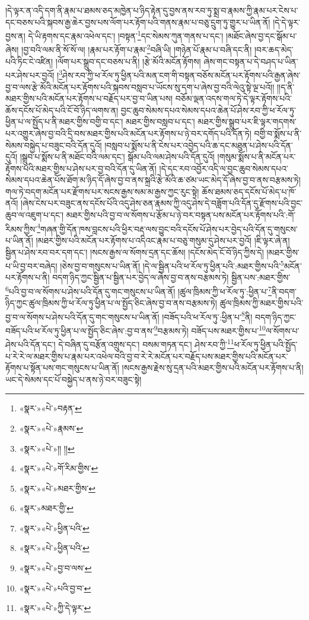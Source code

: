 །དེ་ལྟར་ན་འདི་དག་ནི་རྣམ་པ་ཐམས་ཅད་མཁྱེན་པ་ཉིད་རྟེན་དུ་བྱས་ནས་རབ་ཏུ་སྨྲ་བ་རྣམས་ཀྱི་རྣམ་པར་ངེས་པ་དང་བཅས་པའི་སྐབས་རྒྱ་ཆེར་བྱས་པས་ལོག་པར་རྟོག་པའི་གནས་རྣམ་པ་བཅུ་དྲུག་ཏུ་གྱུར་པ་ཡིན་ནོ། །དེ་དེ་ལྟར་བྱས་ན། དེ་ཡི་རྟགས་དང་རྣམ་འཕེལ་དང་། །བསྟན་\footnote{«སྣར་»«པེ་»བརྟན་}དང་སེམས་ཀུན་གནས་པ་དང་། །མཐོང་ཞེས་བྱ་དང་སྒོམ་པ་ཞེས། །བྱ་བའི་ལམ་ནི་སོ་སོ་ལ། །རྣམ་པར་རྟོག་པ་རྣམ་\footnote{«སྣར་»«པེ་»རྣམས་}བཞི་ཡི། །གཉེན་པོ་རྣམ་པ་བཞི་དང་ནི། །བར་ཆད་མེད་པའི་ཏིང་ངེ་འཛིན། །ལོག་པར་སྒྲུབ་དང་བཅས་པ་ནི། །རྩེ་མོའི་མངོན་རྟོགས། ཞེས་གང་བསྟན་པ་དེ་བཤད་པ་ཡིན་པར་ཤེས་པར་བྱའོ། །\footnote{«སྣར་»«པེ་»།། །།}ཤེས་རབ་ཀྱི་ཕ་རོལ་ཏུ་ཕྱིན་པའི་མན་ངག་གི་བསྟན་བཅོས་མངོན་པར་རྟོགས་པའི་རྒྱན་ཞེས་བྱ་བ་ལས་རྩེ་མོའི་མངོན་པར་རྟོགས་པའི་སྐབས་བསླབ་པ་ཡོངས་སུ་དག་པ་ཞེས་བྱ་བའི་ལེའུ་སྟེ་ལྔ་པའོ།། །།ད་ནི་མཐར་གྱིས་པའི་མངོན་པར་རྟོགས་པ་བརྗོད་པར་བྱ་བ་ཡིན་པས། བཅོམ་ལྡན་འདས་གལ་ཏེ་དེ་ལྟར་རྟོགས་པའི་ཆོས་དངོས་པོ་མེད་པའི་ངོ་བོ་ཉིད་ལགས་ན། བྱང་ཆུབ་སེམས་དཔའ་སེམས་དཔའ་ཆེན་པོ་ཤེས་རབ་ཀྱི་ཕ་རོལ་ཏུ་ཕྱིན་པ་ལ་སྤྱོད་པ་ནི་མཐར་གྱིས་བགྱི་བ་དང་། མཐར་གྱིས་བསླབ་པ་དང་། མཐར་གྱིས་སྒྲུབ་པར་ཇི་ལྟར་གདགས་པར་འགྱུར་ཞེས་བྱ་བའི་དྲི་བས་མཐར་གྱིས་པའི་མངོན་པར་རྟོགས་པ་ཉེ་བར་དགོད་པའི་དོན་ཏེ། བགྱི་བ་སྨོས་པ་ནི་སེམས་བསྐྱེད་པ་བཟུང་བའི་དོན་དུའོ། །བསླབ་པ་སྨོས་པ་ནི་ངེས་པར་འབྱེད་པའི་ཆ་དང་མཐུན་པ་ཤེས་པའི་དོན་དུའོ། །སྒྲུབ་པ་སྨོས་པ་ནི་མཐོང་བའི་ལམ་དང་། སྒོམ་པའི་ལམ་ཤེས་པའི་དོན་དུའོ། །གསུམ་སྨོས་པ་ནི་མངོན་པར་རྟོགས་པའི་མཐར་གྱིས་པ་ཤེས་པར་བྱ་བའི་དོན་དུ་ཡིན་ནོ། །དེ་དང་རབ་འབྱོར་འདི་ལ་བྱང་ཆུབ་སེམས་དཔའ་སེམས་དཔའ་ཆེན་པོས་ཐོག་མ་ཉིད་དོ་ཞེས་བྱ་བ་ནས་སྐྲའི་རྩེ་མོའི་ཆ་ཙམ་ཡང་མེད་དོ་ཞེས་བྱ་བ་ནས་བརྩམས་ཏེ། གལ་ཏེ་བདག་མངོན་པར་རྫོགས་པར་སངས་རྒྱས་སམ་མ་རྒྱས་ཀྱང་རུང་སྟེ། ཆོས་ཐམས་ཅད་དངོས་པོ་མེད་པ་ཁོ་ནའོ། །ཞེས་ངེས་པར་བཟུང་ནས་དངོས་པོའི་འདུ་ཤེས་ཅན་རྣམས་ཀྱི་འདུ་ཤེས་དེ་བཟློག་པའི་དོན་དུ་རྫོགས་པའི་བྱང་ཆུབ་ལ་འཇུག་པ་དང་། མཐར་གྱིས་པའི་བྱ་བ་ལ་སོགས་པ་རྩོམ་པ་ཉེ་བར་བསྟན་པས་མངོན་པར་རྟོགས་པའི་:གོ་རིམས་ཀྱིས་\footnote{«སྣར་»«པེ་»གོ་རིམ་གྱིས་}གཞན་གྱི་དོན་ཁས་བླངས་པའི་ཕྱིར་བརྡ་ལས་བྱུང་བའི་དངོས་པོ་ཤེས་པར་བྱེད་པའི་དོན་དུ་གསུངས་པ་ཡིན་ནོ། །མཐར་གྱིས་པའི་མངོན་པར་རྟོགས་པ་འདིའང་རྣམ་པ་བཅུ་གསུམ་དུ་ཤེས་པར་བྱའོ། །ཇི་ལྟར་ཞེ་ན། སྦྱིན་པ་ཤེས་རབ་བར་དག་དང་། །སངས་རྒྱས་ལ་སོགས་དྲན་དང་ཆོས། །དངོས་མེད་ངོ་བོ་ཉིད་ཀྱིས་དེ། །མཐར་གྱིས་པ་ཡི་བྱ་བར་བཞེད། །ཅེས་བྱ་བ་གསུངས་པ་ཡིན་ནོ། །དེ་ལ་སྦྱིན་པའི་ཕ་རོལ་ཏུ་ཕྱིན་པའི་:མཐར་གྱིས་པའི་\footnote{«སྣར་»«པེ་»མཐར་གྱིས་}མངོན་པར་རྟོགས་པ་ནི། བདག་ཉིད་ཀྱང་སྦྱིན་པ་སྦྱིན་པར་བྱེད་ལ་ཞེས་བྱ་བ་ནས་བརྩམས་ཏེ། སྦྱིན་པས་:མཐར་གྱིས་\footnote{«སྣར་»མཐར་གྱི་}པའི་བྱ་བ་ལ་སོགས་པ་ཤེས་པའི་དོན་དུ་གང་གསུངས་པ་ཡིན་ནོ། །ཚུལ་ཁྲིམས་ཀྱི་ཕ་རོལ་ཏུ་:ཕྱིན་པ་\footnote{«སྣར་»«པེ་»ཕྱིན་པའི་}ནི་བདག་ཉིད་ཀྱང་ཚུལ་ཁྲིམས་ཀྱི་ཕ་རོལ་ཏུ་ཕྱིན་པ་ལ་སྤྱོད་ཅིང་ཞེས་བྱ་བ་ནས་བརྩམས་ཏེ། ཚུལ་ཁྲིམས་ཀྱི་མཐར་གྱིས་པའི་བྱ་བ་ལ་སོགས་པ་ཤེས་པའི་དོན་དུ་གང་གསུངས་པ་ཡིན་ནོ། །བཟོད་པའི་ཕ་རོལ་ཏུ་:ཕྱིན་པ་\footnote{«སྣར་»«པེ་»ཕྱིན་པའི་}ནི། བདག་ཉིད་ཀྱང་བཟོད་པའི་ཕ་རོལ་ཏུ་ཕྱིན་པ་ལ་སྤྱོད་ཅིང་ཞེས་:བྱ་བ་ནས་\footnote{«སྣར་»«པེ་»བྱ་བ་ལས་}བརྩམས་ཏེ། བཟོད་པས་མཐར་གྱིས་པ་\footnote{«སྣར་»«པེ་»པའི་བྱ་བ་}ལ་སོགས་པ་ཤེས་པའི་དོན་དང་། དེ་བཞིན་དུ་བརྩོན་འགྲུས་དང་། བསམ་གཏན་དང་། ཤེས་རབ་ཀྱི་\footnote{«སྣར་»«པེ་»ཀྱི་དེ་ལྟར་}ཕ་རོལ་ཏུ་ཕྱིན་པའི་སྤྱོད་པ་རེ་རེ་ལ་མཐར་གྱིས་པ་རྣམ་པར་འཕེལ་བའི་བྱ་བ་རེ་རེ་མངོན་པར་བརྗོད་པས་མཐར་གྱིས་པའི་མངོན་པར་རྟོགས་པ་སྟོན་པས་གང་གསུངས་པ་ཡིན་ནོ། །སངས་རྒྱས་རྗེས་སུ་དྲན་པའི་མཐར་གྱིས་པའི་མངོན་པར་རྟོགས་པ་ནི། ཡང་དེ་སེམས་དང་པོ་བསྐྱེད་པ་ནས་ཉེ་བར་བཟུང་སྟེ། 